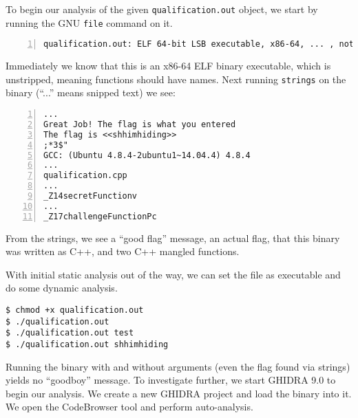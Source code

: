 To begin our analysis of the given \texttt{qualification.out} object, we start by running the GNU \texttt{file} command on it.
\begin{lstlisting}[numbers=left,language=none]
qualification.out: ELF 64-bit LSB executable, x86-64, ... , not stripped
\end{lstlisting}
Immediately we know that this is an x86-64 ELF binary executable, which is unstripped, meaning functions should have names.
Next running \texttt{strings} on the binary (``...'' means snipped text) we see:
\begin{lstlisting}[numbers=left,language=none]
...
Great Job! The flag is what you entered
The flag is <<shhimhiding>>
;*3$"
GCC: (Ubuntu 4.8.4-2ubuntu1~14.04.4) 4.8.4
...
qualification.cpp
...
_Z14secretFunctionv
...
_Z17challengeFunctionPc
\end{lstlisting}
From the strings, we see a ``good flag'' message, an actual flag, that this binary was written as C++, and two C++ mangled functions.

With initial static analysis out of the way, we can set the file as executable and do some dynamic analysis.

\begin{lstlisting}[language=none]
$ chmod +x qualification.out
$ ./qualification.out
$ ./qualification.out test
$ ./qualification.out shhimhiding
\end{lstlisting}

Running the binary with and without arguments (even the flag found via strings) yields no ``goodboy'' message. To investigate further, we start GHIDRA 9.0 to begin our analysis.
We create a new GHIDRA project and load the binary into it. We open the CodeBrowser tool and perform auto-analysis.
